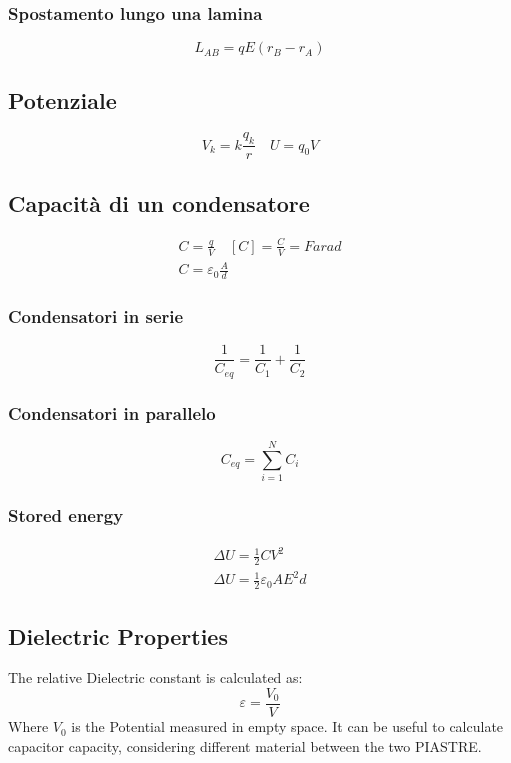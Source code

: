 \documentclass[Master.tex]{subfiles}
\begin{document}
\begin{multicols}{2}
				   \subsubsection{Spostamento lungo una lamina}
						    \[
								     L_{AB} = qE(r_B-r_A)
						    \]

		  \subsection{Potenziale}

				   \[
						    V_{k} = k \frac{q_{k} }{r} \quad U = q_{0} V
				   \]

		  \subsection{Capacità di un condensatore}

				   \begin{gather*}
						    C = \frac{q}{V} \quad [C] = \frac{C}{V} = Farad  \\
						    C = \varepsilon_{0}   \frac{A}{d}
				   \end{gather*}

				   \subsubsection{Condensatori in serie}
						    \[
								     \frac{1}{C_{eq}}= \frac{1}{C_1} + \frac{1}{C_2}
						    \]

				   \subsubsection{Condensatori in parallelo}
						    \[
								     C_{eq} = \sum_{i=1}^{N} C_{i}
						    \]

				   \subsubsection{Stored energy}
						    \begin{gather*}
								     \Delta U = \frac{1}{2}CV^2\\
								     \Delta U =  \frac{1}{2} \varepsilon_{0} A E^2 d
						    \end{gather*}

		  \subsection{Dielectric Properties}
				   The relative Dielectric constant is calculated as:
				   \[
						    \varepsilon = \frac{V_{0}}{V}
				   \]
				   Where \( V_{0} \) is the Potential measured in empty space. It can be useful to
				   calculate capacitor capacity, considering different material between the two
				   PIASTRE.


\end{multicols}
\end{document}
